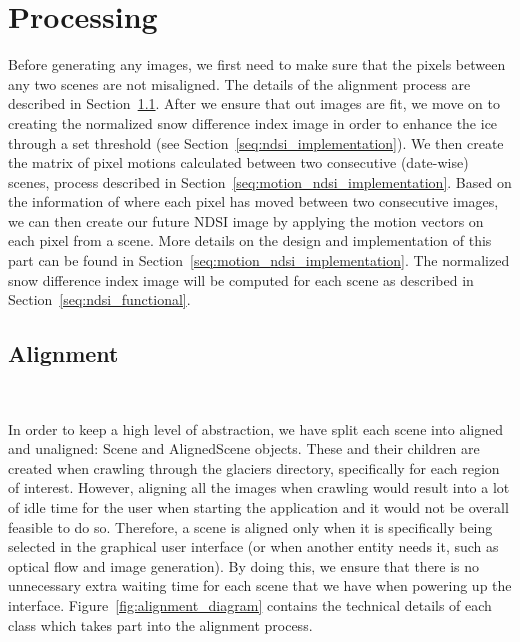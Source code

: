 \documentclass[12pt, a4paper]{report}
\begin{document}

	\section{Processing}
	\label{seq:processing}

	\par Before generating any images, we first need to make sure that the pixels between any two scenes are not misaligned. The details of the alignment process are described in Section~\ref{seq:alignment_implementation}. After we ensure that out images are fit, we move on to creating the normalized snow difference index image in order to enhance the ice through a set threshold (see Section~\ref{seq:ndsi_implementation}). We then create the matrix of pixel motions calculated between two consecutive (date-wise) scenes, process described in Section~\ref{seq:motion_ndsi_implementation}. Based on the information of where each pixel has moved between two consecutive images, we can then create our future NDSI image by applying the motion vectors on each pixel from a scene. More details on the design and implementation of this part can be found in Section~\ref{seq:motion_ndsi_implementation}.
	The normalized snow difference index image will be computed for each scene as described in Section~\ref{seq:ndsi_functional}.
	
	
	\subsection{Alignment}
	\label{seq:alignment_implementation}\
	
	\par In order to keep a high level of abstraction, we have split each scene into aligned and unaligned: Scene and AlignedScene objects. These and their children are created when crawling through the glaciers directory, specifically for each region of interest. However, aligning all the images when crawling would result into a lot of idle time for the user when starting the application and it would not be overall feasible to do so. Therefore, a scene is aligned only when it is specifically being selected in the graphical user interface (or when another entity needs it, such as optical flow and image generation). By doing this, we ensure that there is no unnecessary extra waiting time for each scene that we have when powering up the interface. Figure~\ref{fig:alignment_diagram} contains the technical details of each class which takes part into the alignment process.
	
\end{document}
